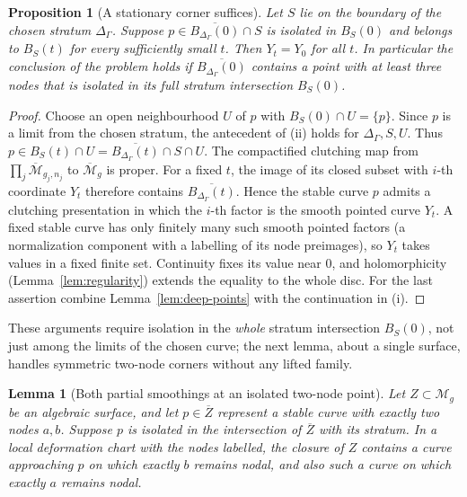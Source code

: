 \documentclass[11pt]{article}
\newcommand{\M}{\mathcal M}
\newcommand{\cl}[1]{\overline{#1}}
\newtheorem{lemma}[theorem]{Lemma}
\newtheorem{proposition}[theorem]{Proposition}
\theoremstyle{remark}
\begin{document}
\begin{proposition}[A stationary corner suffices]\label{prop:fixed-cusp}
Let \(S\) lie on the boundary of the chosen stratum
\(\Delta_\Gamma\). Suppose
\(p\in\cl{B_{\Delta_\Gamma}(0)}\cap S\)
is isolated in \(B_S(0)\) and belongs to \(B_S(t)\) for every
sufficiently small \(t\). Then \(Y_t=Y_0\) for all \(t\). In
particular the conclusion of the problem holds if
\(\cl{B_{\Delta_\Gamma}(0)}\) contains a point with at least three
nodes that is isolated in its full stratum intersection \(B_S(0)\).
\end{proposition}

\begin{proof}
Choose an open neighbourhood \(U\) of \(p\) with
\(B_S(0)\cap U=\{p\}\). Since \(p\) is a limit from the chosen
stratum, the antecedent of (ii) holds for
\(\Delta_\Gamma,S,U\). Thus
\(p\in B_S(t)\cap U=\cl{B_{\Delta_\Gamma}(t)}\cap S\cap U\).
The compactified clutching map from
\(\prod_j\cl{\M}_{g_j,n_j}\) to \(\cl{\M}_g\) is proper. For a fixed \(t\),
the image of its closed subset with \(i\)-th coordinate \(Y_t\)
therefore contains \(\cl{B_{\Delta_\Gamma}(t)}\).
Hence the stable curve \(p\) admits a clutching presentation in
which the \(i\)-th factor is the smooth pointed curve \(Y_t\).
A fixed stable curve has only finitely many such smooth pointed
factors (a normalization component with a labelling of its node
preimages), so \(Y_t\) takes values in a fixed finite set.
Continuity fixes its value near \(0\), and holomorphicity
(Lemma~\ref{lem:regularity}) extends the equality to the whole disc.
For the last assertion combine Lemma~\ref{lem:deep-points} with the
continuation in (i).
\end{proof}

These arguments require isolation in the \emph{whole} stratum
intersection \(B_S(0)\), not just among the limits of the chosen
curve; the next lemma, about a single surface, handles symmetric
two-node corners without any lifted family.

\begin{lemma}[Both partial smoothings at an isolated two-node point]
\label{lem:plumbing}
Let \(Z\subset\M_g\) be an algebraic surface, and let
\(p\in\cl Z\) represent a stable curve with exactly two nodes \(a,b\).
Suppose \(p\) is isolated in the intersection of \(\cl Z\) with its
stratum. In a local deformation chart with the nodes labelled, the
closure of \(Z\) contains a curve approaching \(p\) on which exactly
\(b\) remains nodal, and also such a curve on which exactly
\(a\) remains nodal.
\end{lemma}
\end{document}
